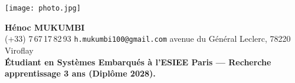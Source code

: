 \documentclass[10pt]{style}
\begin{document}
\begin{center}
  \begin{minipage}[c]{0.18\textwidth}
    \texttt{[image: photo.jpg]}%
  \end{minipage}\hfill
  \begin{minipage}[c]{0.78\textwidth}
    \centering
    {\LARGE\bfseries Hénoc MUKUMBI}\\[-0.2em]
    \small (+33) 7\,67\,17\,82\,93 \quad\textbullet\quad \texttt{h.mukumbi100@gmail.com} \quad\textbullet{} avenue du Général Leclerc, 78220 Viroflay\\[-0.1em]
    \normalsize \textbf{Étudiant en Systèmes Embarqués à l’ESIEE Paris — Recherche apprentissage 3 ans (Diplôme 2028).}
  \end{minipage}
\end{center}


\end{document}
